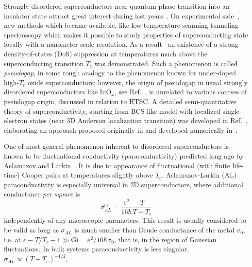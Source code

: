\documentclass[twocolumn,english,prb]{revtex4-1}
\begin{document}
Strongly disordered superconductors near quantum phase transition  into an insulator state
attract great interest during last years~\cite{t1,t2,t3,t4,e1,e2,e3,e4,NP2011,SacepeTiN,Sacepe2009,N1,Teun1}.
On experimental side~\cite{e1,e2,e3,e4,NP2011,SacepeTiN,Sacepe2009,N1,A1,Teun1},  new methods which became available,
like low-temperature scanning tunneling spectroscopy which makes it possible to study properties of 
superconducting state locally with a nanometer-scale resolution. As a result~\cite{NP2011,SacepeTiN} 
an existence of a strong density-of-states (DoS) suppression  at temperatures much above the superconducting transition
 $T_c$ was demonstrated. Such a phenomenon is called \textit{pseudogap}, in some rough analogy to the phenomenon known for 
under-doped high-$T_c$ oxide superconductors; however, the origin of pseudogap in usual strongly disordered
superconductors like InO$_x$, see Ref.~, is unrelated to various  courses of pseudogap origin,
discussed  in relation to HTSC. A detailed  semi-quantitative
theory of  superconductivity, starting from BCS-like model with localized single-electron states (near 3D Anderson 
localization transition) was developed in Ref.~,  elaborating an approach proposed originally in
\cite{ML} and developed numerically in~\cite{Ghosal}.
 
One of most general phenomenon inherent to disordered superconductors is known to be  fluctuational conductivity
(paraconductivity) predicted long ago by Aslamazov and Larkin~\cite{AslamazovLarkin}.  It is due to appearance of
fluctuational (with finite life-time)  Cooper pairs at temperatures slightly above $T_c$.  Aslamazov-Larkin (AL)
paraconductivity is especially universal in 2D superconductors, where additional conductance \textit{per square}
is  
$$\sigma_{AL}^\Box = \frac{e^2}{16\hbar}\frac{T}{T-T_c}$$
independently of any microscopic parameters.  This result is usually considered to be
 valid as long as $\sigma_{AL}$ is much smaller than Drude conductance of the metal $\sigma_0$,
 i.e. at  $\epsilon \equiv T/T_c - 1 \gg \mathrm{Gi} = e^2/16\hbar\sigma_0$,
that is, in the region of Gaussian fluctuations.  In bulk systems paraconductivity is less singular,
$\sigma_{AL} \propto (T-T_c)^{-1/2}$.
\end{document}
